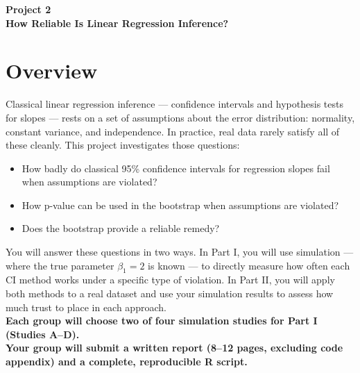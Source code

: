 \documentclass[12pt]{article}
\begin{document}
\begin{center}
\textbf{\Large Project 2 \\ How Reliable Is Linear Regression Inference?} \\
\end{center}


\section*{Overview}

Classical linear regression inference --- confidence intervals and hypothesis tests for slopes --- rests on a set of assumptions about the error distribution: normality, constant variance, and independence. In practice, real data rarely satisfy all of these cleanly. This project investigates those questions:
\begin{itemize}
    \item How badly do classical 95\% confidence intervals for regression slopes fail when assumptions are violated?
    \item How p-value can be used in the bootstrap when assumptions are violated?
    \item Does the bootstrap provide a reliable remedy?
\end{itemize}
You will answer these questions in two ways. In Part I, you will use simulation --- where the true parameter $\beta_1 = 2$ is known --- to directly measure how often each CI method works under a specific type of violation. In Part II, you will apply both methods to a real dataset and use your simulation results to assess how much trust to place in each approach. \\

\noindent\textbf{Each group will choose two of four simulation studies for Part I (Studies A--D).} \\

\noindent\textbf{Your group will submit a written report (8--12 pages, excluding code appendix) and a complete, reproducible R script.}
\end{document}
